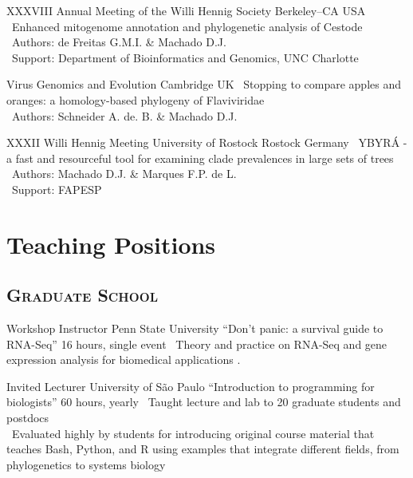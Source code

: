 \documentclass[11pt, letterpaper, sans]{moderncv}
\begin{document}
\vspace{.5em}

	{XXXVIII Annual Meeting of the Willi Hennig Society}
	{Berkeley--CA}
	{USA}
	{}
	{
		\textbullet~Enhanced mitogenome annotation and phylogenetic analysis of Cestode\\
		\textbullet~Authors: de Freitas G.M.I. \& Machado D.J.\\
		\textbullet~Support: Department of Bioinformatics and Genomics,  UNC Charlotte
	}

\vspace{.5em}

	{Virus Genomics and Evolution}
	{Cambridge}
	{UK}
	{}
	{
		\textbullet~Stopping to compare apples and oranges: a homology-based phylogeny of Flaviviridae \\
		\textbullet~Authors: Schneider A. de. B. \& Machado D.J.
}

\vspace{.5em}

	{XXXII Willi Hennig Meeting}
	{University of Rostock}
	{Rostock}
	{Germany}
	{
		\textbullet~YBYRÁ - a fast and resourceful tool for examining clade prevalences in large sets of trees\\
		\textbullet~Authors: Machado D.J. \& Marques F.P. de L.\\
		\textbullet~Support: FAPESP
}

\section{Teaching Positions}

\vspace{.5em}
	\subsection{\textsc{Graduate School}}
\vspace{.5em}

	{Workshop Instructor}
	{Penn State University}
	{``Don't panic: a survival guide to RNA-Seq''}
	{16 hours, single event}
	{
		\textbullet~Theory and practice on RNA-Seq and gene expression analysis for biomedical applications .
	}

	{Invited Lecturer}
	{University of São Paulo}
	{``Introduction to programming for biologists''}
	{60 hours, yearly}
	{
		\textbullet~Taught lecture and lab to 20 graduate students and postdocs\\
		\textbullet~Evaluated highly by students for introducing original course material that teaches Bash, Python, and R using examples that integrate different fields, from phylogenetics to systems biology
	}
\end{document}
